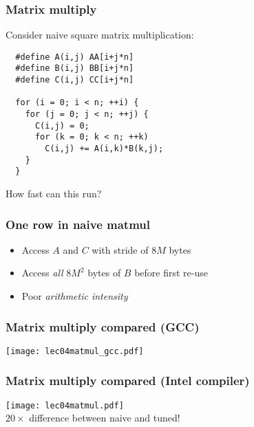 \documentclass{beamer}
\begin{document}
\begin{frame}[fragile]
  \frametitle{Matrix multiply}

  Consider naive square matrix multiplication:
\begin{verbatim}
  #define A(i,j) AA[i+j*n]
  #define B(i,j) BB[i+j*n]
  #define C(i,j) CC[i+j*n]

  for (i = 0; i < n; ++i) {
    for (j = 0; j < n; ++j) {
      C(i,j) = 0;
      for (k = 0; k < n; ++k)
        C(i,j) += A(i,k)*B(k,j);
    }
  }
\end{verbatim}
  How fast can this run?

\end{frame}


\begin{frame}
  \frametitle{One row in naive matmul}

  \begin{center}
  \end{center}

  \begin{itemize}
  \item Access $A$ and $C$ with stride of $8M$ bytes
  \item Access {\em all} $8M^2$ bytes of $B$ before first re-use
  \item Poor {\em arithmetic intensity}
  \end{itemize}
\end{frame}


\begin{frame}
  \frametitle{Matrix multiply compared (GCC)}

  \begin{center}
  \texttt{[image: lec04matmul\_gcc.pdf]}
  \end{center}
  
\end{frame}


\begin{frame}
  \frametitle{Matrix multiply compared (Intel compiler)}

  \begin{center}
  \texttt{[image: lec04matmul.pdf]} \\
  $20 \times$ difference between naive and tuned!
  \end{center}
  
\end{frame}
\end{document}
